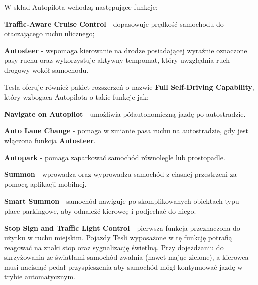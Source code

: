 W skład Autopilota wchodzą następujące funkcje:
\begin{enumerate*}
\item \textbf{Traffic-Aware Cruise Control} - dopasowuje prędkość samochodu do otaczającego ruchu ulicznego;
\item \textbf{Autosteer} - wspomaga kierowanie na drodze posiadającej wyraźnie oznaczone pasy ruchu oraz wykorzystuje aktywny tempomat, który uwzględnia ruch drogowy wokół samochodu.
\end{enumerate*}

Tesla oferuje również pakiet rozszerzeń o nazwie \textbf{Full Self-Driving Capability}, który wzbogaca Autopilota o takie funkcje jak:
\vspace{-0.25cm}
\begin{enumerate*}
\item \textbf{Navigate on Autopilot} - umożliwia półautonomiczną jazdę po autostradzie.
\item \textbf{Auto Lane Change} - pomaga w zmianie pasa ruchu na autostradzie, gdy jest włączona funkcja \textbf{Autosteer}.
\item \textbf{Autopark} - pomaga zaparkować samochód równolegle lub prostopadle.
\item \textbf{Summon} - wprowadza oraz wyprowadza samochód z ciasnej przestrzeni za pomocą aplikacji mobilnej.
\item \textbf{Smart Summon} - samochód nawiguje po skomplikowanych obiektach typu place parkingowe, aby odnaleźć kierowcę i podjechać do niego.
\item \textbf{Stop Sign and Traffic Light Control} - pierwsza funkcja przeznaczona do użytku w ruchu miejskim. Pojazdy Tesli wyposażone w tę funkcję potrafią reagować na znaki stop oraz sygnalizację świetlną. Przy dojeżdżaniu do skrzyżowania ze światłami samochód zwalnia (nawet mając zielone), a kierowca musi nacisnąć pedał przyspieszenia aby samochód mógł kontynuować jazdę w trybie automatycznym.
\end{enumerate*}

